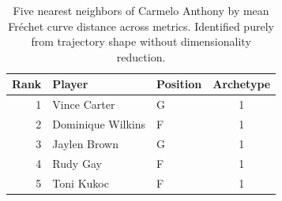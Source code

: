 \begin{table}[htbp]
  \centering\small
  \begin{tabular}{rllc}
    \toprule
    Rank & Player & Position & Archetype \\
    \midrule
    1 & Vince Carter & G & 1 \\
    2 & Dominique Wilkins & F & 1 \\
    3 & Jaylen Brown & G & 1 \\
    4 & Rudy Gay & F & 1 \\
    5 & Toni Kukoc & F & 1 \\
    \bottomrule
  \end{tabular}
  \caption{Five nearest neighbors of Carmelo Anthony by mean Fr\'{e}chet curve distance across metrics. Identified purely from trajectory shape without dimensionality reduction.}
  \label{tab:Carmelo_Anthony_frechet_curve_neighbors}
\end{table}

